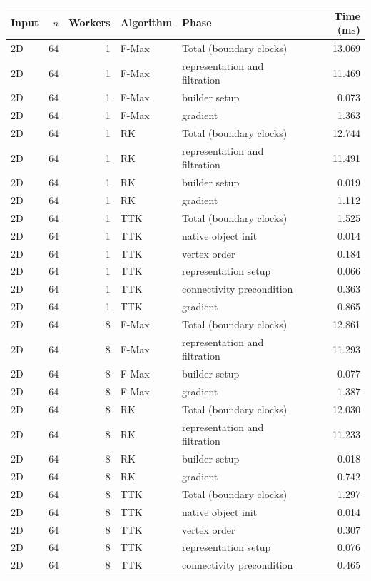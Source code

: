\begin{tabular}{lrrllr}
\hline
Input & $n$ & Workers & Algorithm & Phase & Time (ms) \\
\hline
2D & 64 & 1 & F-Max & Total (boundary clocks) & 13.069 \\
2D & 64 & 1 & F-Max & representation and filtration & 11.469 \\
2D & 64 & 1 & F-Max & builder setup & 0.073 \\
2D & 64 & 1 & F-Max & gradient & 1.363 \\
2D & 64 & 1 & RK & Total (boundary clocks) & 12.744 \\
2D & 64 & 1 & RK & representation and filtration & 11.491 \\
2D & 64 & 1 & RK & builder setup & 0.019 \\
2D & 64 & 1 & RK & gradient & 1.112 \\
2D & 64 & 1 & TTK & Total (boundary clocks) & 1.525 \\
2D & 64 & 1 & TTK & native object init & 0.014 \\
2D & 64 & 1 & TTK & vertex order & 0.184 \\
2D & 64 & 1 & TTK & representation setup & 0.066 \\
2D & 64 & 1 & TTK & connectivity precondition & 0.363 \\
2D & 64 & 1 & TTK & gradient & 0.865 \\
2D & 64 & 8 & F-Max & Total (boundary clocks) & 12.861 \\
2D & 64 & 8 & F-Max & representation and filtration & 11.293 \\
2D & 64 & 8 & F-Max & builder setup & 0.077 \\
2D & 64 & 8 & F-Max & gradient & 1.387 \\
2D & 64 & 8 & RK & Total (boundary clocks) & 12.030 \\
2D & 64 & 8 & RK & representation and filtration & 11.233 \\
2D & 64 & 8 & RK & builder setup & 0.018 \\
2D & 64 & 8 & RK & gradient & 0.742 \\
2D & 64 & 8 & TTK & Total (boundary clocks) & 1.297 \\
2D & 64 & 8 & TTK & native object init & 0.014 \\
2D & 64 & 8 & TTK & vertex order & 0.307 \\
2D & 64 & 8 & TTK & representation setup & 0.076 \\
2D & 64 & 8 & TTK & connectivity precondition & 0.465 \\

\end{tabular}
